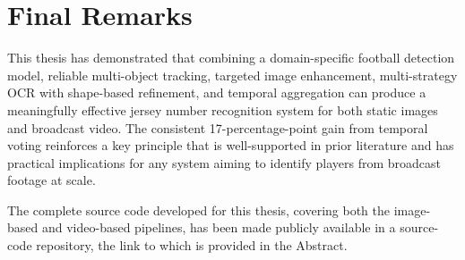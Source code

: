 \section{Final Remarks}

This thesis has demonstrated that combining a domain-specific football
detection model, reliable multi-object tracking, targeted image
enhancement, multi-strategy OCR with shape-based refinement, and
temporal aggregation can produce a meaningfully effective jersey number
recognition system for both static images and broadcast video.
The consistent 17-percentage-point gain from temporal voting
reinforces a key principle that is well-supported in prior literature
and has practical implications for any system aiming to identify players
from broadcast footage at scale.

The complete source code developed for this thesis, covering both the
image-based and video-based pipelines, has been made publicly
available in a source-code repository, the link to which is provided
in the Abstract.
